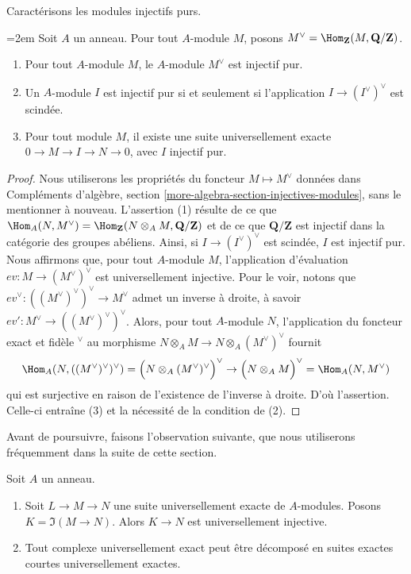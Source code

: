 \noindent
Caractérisons les modules injectifs purs.

\begin{lemma}
\label{lemma-pure-injective}
{\emergencystretch=2em
Soit $A$ un anneau. Pour tout $A$-module $M$, posons
$M^\vee = \Hom_\mathbf{Z}(M, \mathbf{Q}/\mathbf{Z})$.
\par}
\begin{enumerate}
\item Pour tout $A$-module $M$, le $A$-module $M^\vee$ est injectif pur.
\item Un $A$-module $I$ est injectif pur si et seulement si l'application
$I \to (I^\vee)^\vee$ est scindée.
\item Pour tout module $M$, il existe une suite universellement exacte
$0 \to M \to I \to N \to 0$, avec $I$ injectif pur.
\end{enumerate}
\end{lemma}

\begin{proof}
Nous utiliserons les propriétés du foncteur $M \mapsto M^\vee$ données dans
Compléments d'algèbre, section \ref{more-algebra-section-injectives-modules},
sans le mentionner à nouveau. L'assertion (1) résulte de ce que
$\Hom_A(N, M^\vee) =
\Hom_\mathbf{Z}(N \otimes_A M, \mathbf{Q}/\mathbf{Z})$
et de ce que $\mathbf{Q}/\mathbf{Z}$ est injectif dans la catégorie des
groupes abéliens. Ainsi, si $I \to (I^\vee)^\vee$ est scindée,
$I$ est injectif pur. Nous affirmons que, pour tout $A$-module $M$,
l'application d'évaluation $ev : M \to (M^\vee)^\vee$ est universellement injective.
Pour le voir, notons que $ev^\vee : ((M^\vee)^\vee)^\vee \to M^\vee$
admet un inverse à droite, à savoir $ev' : M^\vee \to ((M^\vee)^\vee)^\vee$.
Alors, pour tout $A$-module $N$, l'application du foncteur exact et fidèle
${}^\vee$ au morphisme $N \otimes_A M \to N \otimes_A (M^\vee)^\vee$
fournit
$$
\Hom_A(N, ((M^\vee)^\vee)^\vee) =
\Big(N \otimes_A (M^\vee)^\vee\Big)^\vee
\to
\Big(N \otimes_A M\Big)^\vee =
\Hom_A(N, M^\vee)
$$
qui est surjective en raison de l'existence de l'inverse à droite. D'où l'assertion.
Celle-ci entraîne (3) et la nécessité de la condition de (2).
\end{proof}

\noindent
Avant de poursuivre, faisons l'observation suivante, que nous utiliserons
fréquemment dans la suite de cette section.

\begin{lemma}
\label{lemma-split-universally-exact-sequence}
Soit $A$ un anneau.
\begin{enumerate}
\item Soit $L \to M \to N$ une suite universellement exacte
de $A$-modules. Posons $K = \Im(M \to N)$.
Alors $K \to N$ est universellement injective.
\item Tout complexe universellement exact
peut être décomposé en suites exactes courtes universellement exactes.
\end{enumerate}
\end{lemma}

